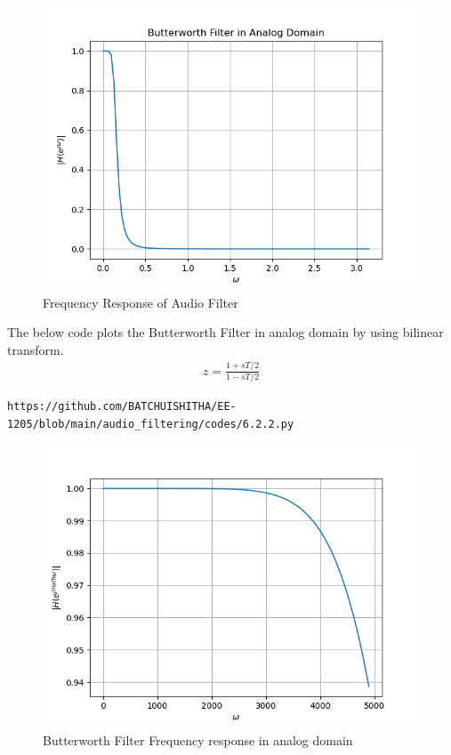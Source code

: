 \documentclass[journal,12pt,twocolumn]{IEEEtran}
\theoremstyle{remark}
\begin{document}
\begin{enumerate}[label=\thesection.\arabic*]
\begin{figure}[ht]
\includegraphics[width=1\columnwidth]{figs/6.2.1.png}
\caption{Frequency Response of Audio Filter}
\label{fig:6.2.1}
\end{figure}
The below code plots the Butterworth Filter in analog domain by using bilinear transform.
\begin{align}
    z=\frac{1+sT/2}{1-sT/2}
\end{align}
\begin{lstlisting}
https://github.com/BATCHUISHITHA/EE-1205/blob/main/audio_filtering/codes/6.2.2.py
\end{lstlisting}
\begin{figure}[H]
\centering
\includegraphics[width=1\columnwidth]{figs/6.2.2.png}
\caption{Butterworth Filter Frequency response in analog domain}

\end{figure}
\end{enumerate}
\end{document}
